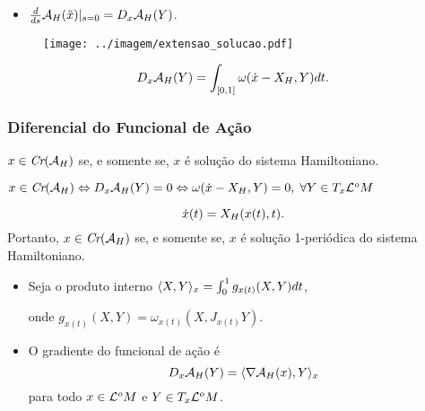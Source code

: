 \documentclass{beamer}
\begin{document}
\begin{footnotesize}
\begin{frame}
\begin{minipage}[t]{0.55\linewidth}
\begin{itemize}
				\item  $\frac{d }{d s}\mathcal{A}_{H}(\tilde{x})|_{s=0} = D_{x}\mathcal{A}_{H}(Y) $.
				
			\end{itemize}
			
		\end{minipage}
		\hfill
		\begin{minipage}[t]{0.4\linewidth}
			\begin{figure}[!h]
				\centering
				\texttt{[image: ../imagem/extensao\_solucao.pdf]}
				
			\end{figure}
		\end{minipage}
			
				
		\begin{proposicao}
			$$
		D_{x}\mathcal{A}_{H}(Y) = \int_{[0,1]} \omega(\dot{x} - X_{H}, Y)dt.
		$$
		\end{proposicao}
		
	\end{frame}
	
	\begin{frame}
				\frametitle{Diferencial do Funcional de Ação}
		\begin{proposicao}
			$x \in \textit{Cr}(\mathcal{A}_{H})$ se, e somente se, $x$ é solução do sistema Hamiltoniano.
		\end{proposicao}
		\begin{prova}
			$x \in \textit{Cr}(\mathcal{A}_{H}) \Leftrightarrow
			D_{x}\mathcal{A}_{H}(Y) = 0 \Leftrightarrow \omega(\dot{x} - X_{H}, Y)=0,\; \forall Y \in T_{x}\mathcal{L}^{o}M
			$
			
			$$
			\dot{x}(t) =X_{H}(x(t), t).
			$$
			Portanto, $x \in \textit{Cr}(\mathcal{A}_{H})$ se, e somente se, $x$ é solução 1-periódica do sistema Hamiltoniano. 
		\end{prova}
		\begin{itemize}
			\item 
			Seja o produto interno $ \langle X, Y \rangle_{x} = \int_{0}^{1}g_{x(t)}(X, Y)dt$, 
			
			onde $g_{x(t)}(X,Y) = \omega_{x(t)}(X,J_{x(t)}Y)$.
			
			\item O gradiente do funcional de ação é 
			$$
			D_{x}\mathcal{A}_{H}(Y) = \langle \nabla \mathcal{A}_{H}(x), Y \rangle_{x}
			$$
			para todo $x \in \mathcal{L}^{o}M$ e $Y \in T_{x}\mathcal{L}^{o}M$.
			

\end{itemize}
\end{frame}
\end{footnotesize}
\end{document}
